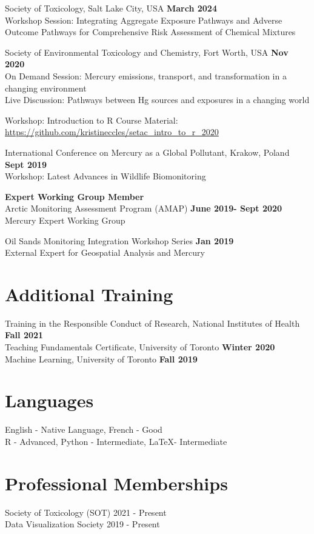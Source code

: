 \documentclass[margin,line]{res}
\begin{document}
\begin{resume}
Society of Toxicology, Salt Lake City, USA \hfill {\bf  March 2024}\\
Workshop Session: Integrating Aggregate Exposure Pathways and Adverse Outcome Pathways for Comprehensive Risk Assessment of Chemical Mixtures

Society of Environmental Toxicology and Chemistry, Fort Worth, USA \hfill {\bf  Nov 2020}\\
On Demand Session: Mercury emissions, transport, and transformation in a changing environment\\
Live Discussion: Pathways between Hg sources and exposures in a changing world

Workshop: Introduction to R
Course Material: \url{https://github.com/kristineccles/setac_intro_to_r_2020}

International Conference on Mercury as a Global Pollutant, Krakow, Poland \hfill {\bf Sept 2019}\\
Workshop: Latest Advances in Wildlife Biomonitoring

{\bf Expert Working Group Member}\\
Arctic Monitoring Assessment Program (AMAP)
\hfill {\bf  June 2019- Sept 2020}\\
Mercury Expert Working Group

Oil Sands Monitoring Integration Workshop Series
\hfill {\bf  Jan 2019}\\
External Expert for Geospatial Analysis and Mercury

\vspace*{.1in}

\section{\sc Additional Training}
Training in the Responsible Conduct of Research, National Institutes of Health \hfill {\bf  Fall 2021}\\
Teaching Fundamentals Certificate, University of Toronto
\hfill {\bf  Winter 2020}\\
Machine Learning, University of Toronto
\hfill {\bf  Fall 2019}

\vspace*{.1in}

\section{\sc Languages}

English - Native Language, French - Good\\
R - Advanced, Python - Intermediate, LaTeX- Intermediate

\vspace*{.1in}

\section{\sc Professional Memberships}
Society of Toxicology (SOT) 2021 - Present \\
Data Visualization Society 2019 - Present\\


\end{resume}
\end{document}
